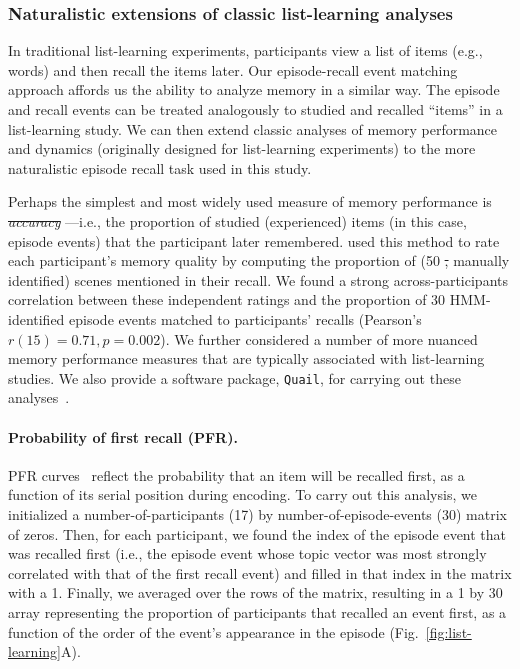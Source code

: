 \documentclass[10pt]{article}
\renewcommand{\includegraphics}[2][]{} %
\providecommand{\DIFaddtex}[1]{{\protect\color{blue}\uwave{#1}}} %
\providecommand{\DIFdeltex}[1]{{\protect\color{red}\sout{#1}}}                      %
\providecommand{\DIFaddbegin}{} %
\providecommand{\DIFaddend}{} %
\providecommand{\DIFdelbegin}{} %
\providecommand{\DIFdelend}{} %
\providecommand{\DIFadd}[1]{\texorpdfstring{\DIFaddtex{#1}}{#1}} %
\providecommand{\DIFdel}[1]{\texorpdfstring{\DIFdeltex{#1}}{}} %
\newcommand{\DIFscaledelfig}{0.5}
\newlength{\DIFdelgraphicswidth} %
\newlength{\DIFdelgraphicsheight} %
\newcommand{\DIFaddincludegraphics}[2][]{{\color{blue}\fbox{\DIFOincludegraphics[#1]{#2}}}} %
\newcommand{\DIFdelincludegraphics}[2][]{%
\sbox{\DIFdelgraphicsbox}{\DIFOincludegraphics[#1]{#2}}%
\settoboxwidth{\DIFdelgraphicswidth}{\DIFdelgraphicsbox} %
\settoboxtotalheight{\DIFdelgraphicsheight}{\DIFdelgraphicsbox} %
\scalebox{\DIFscaledelfig}{%
\parbox[b]{\DIFdelgraphicswidth}{\usebox{\DIFdelgraphicsbox}\\[-\baselineskip] \rule{\DIFdelgraphicswidth}{0em}}\llap{\resizebox{\DIFdelgraphicswidth}{\DIFdelgraphicsheight}{%
\setlength{\unitlength}{\DIFdelgraphicswidth}%
\begin{picture}(1,1)%
\thicklines\linethickness{2pt} %
{\color[rgb]{1,0,0}\put(0,0){\framebox(1,1){}}}%
{\color[rgb]{1,0,0}\put(0,0){\line( 1,1){1}}}%
{\color[rgb]{1,0,0}\put(0,1){\line(1,-1){1}}}%
\end{picture}%
}\hspace*{3pt}}} %
} %
\DeclareRobustCommand{\DIFaddbegin}{\DIFOaddbegin \let\includegraphics\DIFaddincludegraphics} %
\DeclareRobustCommand{\DIFaddend}{\DIFOaddend \let\includegraphics\DIFOincludegraphics} %
\DeclareRobustCommand{\DIFdelbegin}{\DIFOdelbegin \let\includegraphics\DIFdelincludegraphics} %
\DeclareRobustCommand{\DIFdelend}{\DIFOaddend \let\includegraphics\DIFOincludegraphics} %
\begin{document}
\subsubsection*{Naturalistic extensions of classic list-learning analyses}
In traditional list-learning experiments, participants view a list of items (e.g., words) and then recall the items later.  Our episode-recall event matching approach affords us the ability to analyze memory in a similar way. The episode and recall events can be treated analogously to studied and recalled ``items'' in a list-learning study.  We can then extend classic analyses of memory performance and dynamics (originally designed for list-learning experiments) to the more naturalistic episode recall task used in this study.

Perhaps the simplest and most widely used measure of memory performance is \DIFdelbegin \textit{\DIFdel{accuracy}}%
\DIFdelend \DIFaddbegin \DIFadd{``accuracy''}\DIFaddend ---i.e., the proportion of studied (experienced) items (in this case, episode events) that the participant later remembered.  \DIFaddbegin \DIFadd{Chen et al.~(2017)~}\DIFaddend \cite{ChenEtal17} used this method to rate each participant's memory quality by computing the proportion of (50 \DIFdelbegin \DIFdel{, }\DIFdelend manually identified) scenes mentioned in their recall.  We found a strong across-participants correlation between these independent ratings and the proportion of 30 HMM-identified episode events matched to participants' recalls (Pearson's \DIFdelbegin \DIFdel{$r(15) = 0.71, p = 0.002$}\DIFdelend \DIFaddbegin \DIFadd{$r(15) = 0.71, p = 0.002,~95\%~\mathrm{CI} = [0.39, 0.88]$}\DIFaddend ).  We further considered a number of more nuanced memory performance measures that are typically associated with list-learning studies.  We also provide a software package, \texttt{Quail}, for carrying out these analyses~\citep{HeusEtal17b}.

\paragraph{Probability of first recall (PFR).}  PFR curves~\citep{WelcBurn24, PostPhil65, AtkiShif68} reflect the probability that an item will be recalled first, as a function of its serial position during encoding. To carry out this analysis, we initialized a number-of-participants (17) by number-of-episode-events (30) matrix of zeros. Then, for each participant, we found the index of the episode event that was recalled first (i.e., the episode event whose topic vector was most strongly correlated with that of the first recall event) and filled in that index in the matrix with a 1.  Finally, we averaged over the rows of the matrix, resulting in a 1 by 30 array representing the proportion of participants that recalled an event first, as a function of the order of the event's appearance in the episode (Fig.~\ref{fig:list-learning}A).
\end{document}
